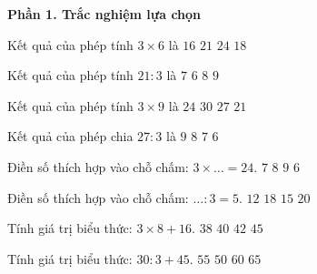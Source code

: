 \textbf{Phần 1. Trắc nghiệm lựa chọn}

\begin{ex} %
Kết quả của phép tính $3 \times 6$ là
\choice
{$16$}
{$21$}
{$24$}
{\True $18$}
\end{ex}

\begin{ex} %
Kết quả của phép tính $21 : 3$ là
\choice
{\True $7$}
{$6$}
{$8$}
{$9$}
\end{ex}

\begin{ex} %
Kết quả của phép tính $3 \times 9$ là
\choice
{$24$}
{$30$}
{\True $27$}
{$21$}
\end{ex}

\begin{ex} %
Kết quả của phép chia $27 : 3$ là
\choice
{\True $9$}
{$8$}
{$7$}
{$6$}
\end{ex}

\begin{ex} %
Điền số thích hợp vào chỗ chấm: $3 \times \dots = 24$.
\choice
{$7$}
{\True $8$}
{$9$}
{$6$}
\end{ex}

\begin{ex} %
Điền số thích hợp vào chỗ chấm: $\dots : 3 = 5$.
\choice
{$12$}
{$18$}
{\True $15$}
{$20$}
\end{ex}

\begin{ex} %
Tính giá trị biểu thức: $3 \times 8 + 16$.
\choice
{$38$}
{\True $40$}
{$42$}
{$45$}
\end{ex}

\begin{ex} %
Tính giá trị biểu thức: $30 : 3 + 45$.
\choice
{\True $55$}
{$50$}
{$60$}
{$65$}
\end{ex}

